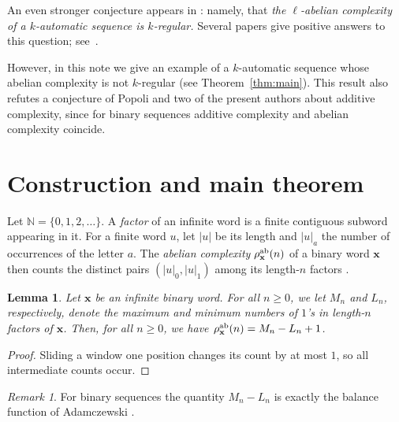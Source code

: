 \documentclass[12pt]{article}
\theoremstyle{plain}
\newtheorem{lemma}[theorem]{Lemma}
\theoremstyle{definition}
\theoremstyle{remark}
\newtheorem{remark}[theorem]{Remark}
\newcommand{\N}{\mathbb{N}}
\numberwithin{equation}{section}
\begin{document}
An even stronger conjecture appears in \cite{PRRV}: 
namely, that {\it the $\ell$-abelian complexity of a $k$-automatic 
sequence is $k$-regular.} Several papers give positive answers to this question; see~\cite{CLW,Couvreur2025,Greinecker,LCW,PRRV}.

However, in this note we give an example of a $k$-automatic sequence whose abelian complexity is not $k$-regular (see Theorem~\ref{thm:main}).  This result also refutes a conjecture of Popoli and two of the present authors \cite[Conj.~4]{Popoli&Shallit&Stipulanti:2024} about additive complexity, since for binary sequences additive complexity and abelian complexity coincide.

\section{Construction and main theorem}

Let $\N=\{0,1,2,\ldots\}$. A \emph{factor} of an infinite
word is a finite contiguous subword appearing in it. For a finite word $u$,
let $\lvert u \rvert$ be its length and $\lvert u\rvert_a$ the number of occurrences of the letter $a$.
The \emph{abelian complexity} $\rho_{\mathbf{x}}^{\rm ab}(n)$ of a
binary word $\mathbf{x}$ then counts the distinct pairs
$(\lvert u\rvert_0, \lvert u\rvert_1)$ among its length-$n$ factors \cite{Richomme&Saari&Zamboni:2011}.

\begin{lemma}
\label{lem:computing-abcompl}
Let $\mathbf{x}$ be an infinite binary word.
For all $n\ge 0$, we let $M_n$ and $L_n$, respectively, denote the maximum and minimum numbers of $1$'s in length-$n$ factors of $\mathbf{x}$.
Then, for all $n\ge 0$, we have $\rho_{\mathbf{x}}^{\rm ab}(n)=M_n-L_n+1$.
\end{lemma}
\begin{proof}
Sliding a window one position changes its count by at most $1$, so all intermediate counts occur. 
\end{proof}

\begin{remark} For binary sequences the
quantity $M_n - L_n$ is exactly the balance function of
Adamczewski \cite{Adamczewski:2003}.
\end{remark}
\end{document}
